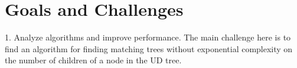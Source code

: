 






\section{Goals and Challenges}





1. Analyze algorithms and improve performance. The main challenge here is to find an algorithm for finding matching trees without exponential complexity on the number of children of a node in the UD tree.

